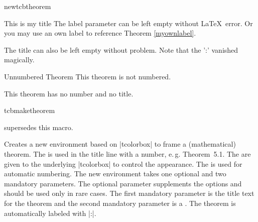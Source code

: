 \begin{docCommand}{newtcbtheorem}{}
\begin{dispExample}
\begin{mytheo}[label=myownlabel]{This is my title}{}
  The label parameter can be left empty without \LaTeX\ error.
  Or you may use an own label to reference Theorem \ref{myownlabel}.
\end{mytheo}
\end{dispExample}

\begin{dispExample}
\begin{mytheo}{}{}
  The title can also be left empty without problem. Note that the ':'
  vanished magically.
\end{mytheo}
\end{dispExample}

\begin{dispExample}
\begin{mytheo*}{Unnumbered Theorem}
  This theorem is not numbered.
\end{mytheo*}
\end{dispExample}

\begin{dispExample}
\begin{mytheo*}{}
  This theorem has no number and no title.
\end{mytheo*}
\end{dispExample}
\end{docCommand}




\begin{docCommand}{tcbmaketheorem}{}
\smallskip\begin{marker}
 supersedes this macro.
\end{marker}
\begin{deprecated}
  Creates a new environment  based on |tcolorbox| to frame a
  (mathematical) theorem. The  is used in the title line
  with a number, e.\,g. \mbox{\flqq Theorem 5.1\frqq}.
  The  are given to the underlying |tcolorbox| to control
  the appearance.
  The  is used for automatic numbering.
  The new environment  takes one optional and two mandatory
  parameters. The optional parameter supplements the options and should be
  used only in rare cases.
  The first mandatory parameter is the title text for the theorem and
  the second mandatory parameter is a . The theorem is
  automatically labeled with |:|.
\end{deprecated}
\end{docCommand}

